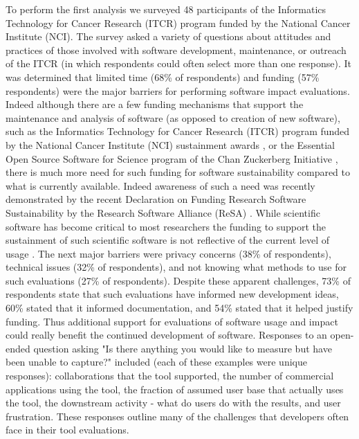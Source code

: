 \documentclass{article}
\begin{document}
To perform the first analysis we surveyed 48 participants of the Informatics Technology for Cancer Research (ITCR) program funded by the National Cancer Institute (NCI). The survey asked a variety of questions about attitudes and practices of those involved with software development, maintenance, or outreach of the ITCR (in which respondents could often select more than one response). It was determined that limited time (68\% of respondents) and funding (57\% respondents) were the major barriers for performing software impact evaluations. Indeed although there are a few funding mechanisms that support the maintenance and analysis of software (as opposed to creation of new software), such as the Informatics Technology for Cancer Research (ITCR) program funded by the National Cancer Institute (NCI) sustainment awards \cite{kibbe_cancer_2017, warner_informatics_2020}, or the Essential Open Source Software for Science program of the Chan Zuckerberg Initiative \cite{CZ_essential_2019}, there is much more need for such funding for software sustainability compared to what is currently available. Indeed awareness of such a need was recently demonstrated by the recent Declaration on Funding Research Software Sustainability by the Research Software Alliance (ReSA) \cite{barker_amsterdam_2023}. While scientific software has become critical to most researchers the funding to support 
 the sustainment of such scientific software is not reflective of the current level of usage \cite{siepel_challenges_2019}. The next major barriers were privacy concerns (38\% of respondents), technical issues (32\% of respondents), and not knowing what methods to use for such evaluations (27\% of respondents). Despite these apparent challenges,  73\% of respondents state that such evaluations have informed new development ideas, 60\% stated that it informed documentation, and 54\% stated that it helped justify funding.  Thus additional support for evaluations of software usage and impact could really benefit the continued development of software. Responses to an open-ended question asking "Is there anything you would like to measure but have been unable to capture?" included (each of these examples were unique responses): collaborations that the tool supported, the number of commercial applications using the tool, the fraction of assumed user base that actually uses the tool, the downstream activity - what do users do with the results, and user frustration. These responses outline many of the challenges that developers often face in their tool evaluations.
\end{document}
